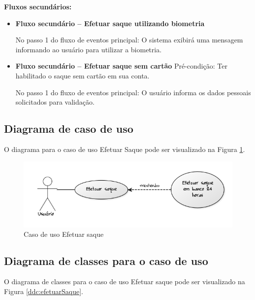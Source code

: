 \textbf{Fluxos secundários:}

\begin{itemize}
  \item \textbf{Fluxo secundário – Efetuar saque utilizando biometria}

  No passo 1 do fluxo de eventos principal:
  \subitem O sistema exibirá uma mensagem informando ao usuário para utilizar a biometria.

  \item \textbf{Fluxo secundário – Efetuar saque sem cartão}
  Pré-condição: Ter habilitado o saque sem cartão em sua conta.

  No passo 1 do fluxo de eventos principal:
  \subitem O usuário informa os dados pessoais solicitados para validação.

\end{itemize}

\subsection{Diagrama de caso de uso}

O diagrama para o caso de uso Efetuar Saque pode ser visualizado na Figura \ref{cdu:efetuarSaque}.

\begin{figure}[!htb]
     \centering
     \includegraphics[scale=0.6]{diagramas/caso-de-uso/imagens/efetuarSaque.png}
     \caption{Caso de uso Efetuar saque}
     \label{cdu:efetuarSaque}
\end{figure}

\subsection{Diagrama de classes para o caso de uso}

O diagrama de classes para o caso de uso Efetuar saque pode ser visualizado na Figura \ref{ddc:efetuarSaque}.

